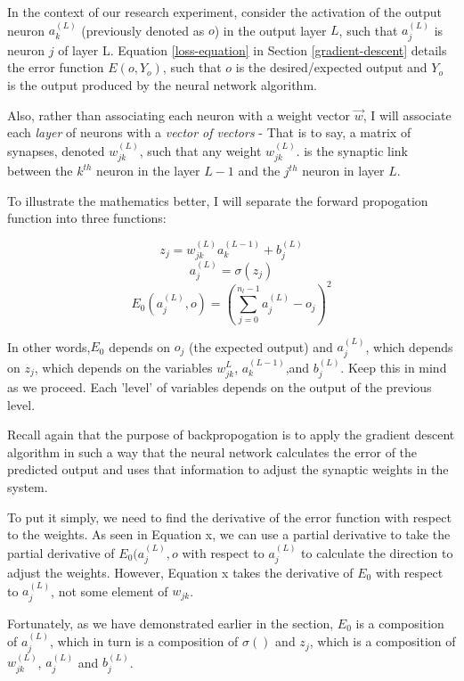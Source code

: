 \documentclass[12pt]{article}
\begin{document}
        In the context of our research experiment, consider the activation of the output neuron $a_k^{(L)}$ (previously denoted as $o$) in the output layer $L$, such that $a_j^{(L)}$ is neuron $j$ of layer L. Equation \ref{loss-equation} in Section \ref{gradient-descent} details the error function $E(o, Y_o)$, such that $o$ is the desired/expected output and $Y_o$ is the output produced by the neural network algorithm.

        Also, rather than associating each neuron with a weight vector $\vec{w}$, I will associate each \textit{layer} of neurons with a \textit{vector of vectors} - That is to say, a matrix of synapses, denoted $w_{jk}^{(L)}$, such that any weight $w_{jk}^{(L)}$. is the synaptic link between the $k^{th}$ neuron in the layer $L-1$ and the $j^{th}$ neuron in layer $L$.

        To illustrate the mathematics better, I will separate the forward propogation function into three functions:

            \[ z_j = w_{jk}^{ (L)}a_k^{(L-1)} + b_j^{(L)} \]
            \[ a_j^{(L)} =\sigma (z_j) \]
            \[ E_0(a_j^{(L)}, o) = (\sum_{j=0}^{n_l-1} a_j^{(L)} - o_j)^2 \]

        In other words,$E_0$ depends on $o_j$ (the expected output) and $a_j^{(L)}$, which depends on $z_j$, which depends on the variables $w_{jk}^{L}$, $a_k^{(L-1)}$,and $b_j^{(L)}$. Keep this in mind as we proceed. Each 'level' of variables depends on the output of the previous level. 

        Recall again that the purpose of backpropogation is to apply the gradient descent algorithm in such a way that the neural network calculates the error of the predicted output and uses that information to adjust the synaptic weights in the system.

        To put it simply, we need to find the derivative of the error function with respect to the weights. As seen in Equation x, we can use a partial derivative to take the partial derivative of \(E_0(a_j^{(L)}, o\) with respect to \(a_j^{(L)}\) to calculate the direction to adjust the weights. However, Equation x takes the derivative of \(E_0\) with respect to \(a_j^{(L)}\), not some element of $w_{jk}$.

        Fortunately, as we have demonstrated earlier in the section, $E_0$ is a composition of $a_j^{(L)}$, which in turn is a composition of $\sigma ()$ and $z_j$, which is a composition of $w_{jk}^{(L)}$, $a_j^{(L)}$ and $b_j^{(L)}$.
\end{document}
